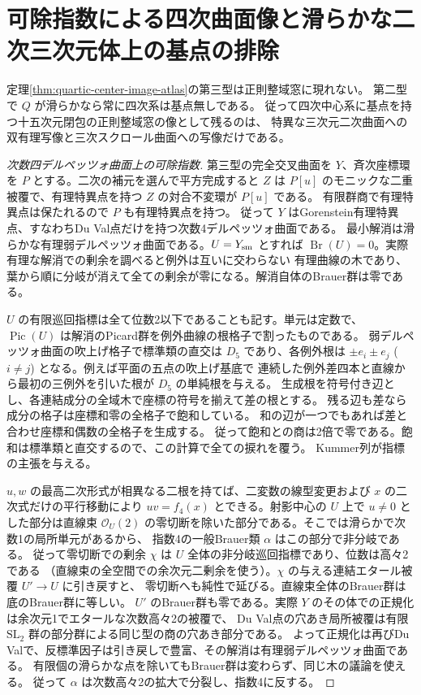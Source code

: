 \section{可除指数による四次曲面像と滑らかな二次三次元体上の基点の排除}
\label{sec:exclude-del-pezzo-center-images}
\begin{theorem}\label{thm:exclude-del-pezzo-center-images}
定理\ref{thm:quartic-center-image-atlas}の第三型は正則整域窓に現れない。
第二型で $Q$ が滑らかなら常に四次系は基点無しである。
従って四次中心系に基点を持つ十五次元閉包の正則整域窓の像として残るのは、
特異な三次元二次曲面への双有理写像と三次スクロール曲面への写像だけである。
\end{theorem}
\begin{proof}[次数四デルペッツォ曲面上の可除指数]
第三型の完全交叉曲面を $Y$、斉次座標環を $P$ とする。二次の補元を選んで平方完成すると
$Z$ は $P[u]$ のモニックな二重被覆で、有理特異点を持つ $Z$ の対合不変環が $P[u]$ である。
有限群商で有理特異点は保たれるので $P$ も有理特異点を持つ。
従って $Y$ はGorenstein有理特異点、すなわちDu Val点だけを持つ次数4デルペッツォ曲面である。
最小解消は滑らかな有理弱デルペッツォ曲面である。$U=Y_{\rm sm}$ とすれば
$\operatorname{Br}(U)=0$。実際有理な解消での剰余を調べると例外は互いに交わらない
有理曲線の木であり、葉から順に分岐が消えて全ての剰余が零になる。解消自体のBrauer群は零である。

$U$ の有限巡回指標は全て位数2以下であることも記す。単元は定数で、
$\operatorname{Pic}(U)$ は解消のPicard群を例外曲線の根格子で割ったものである。
弱デルペッツォ曲面の吹上げ格子で標準類の直交は $D_5$ であり、各例外根は
$\pm e_i\pm e_j$ ($i\ne j$) となる。例えば平面の五点の吹上げ基底で
連続した例外差四本と直線から最初の三例外を引いた根が $D_5$ の単純根を与える。
生成根を符号付き辺とし、各連結成分の全域木で座標の符号を揃えて差の根とする。
残る辺も差なら成分の格子は座標和零の全格子で飽和している。
和の辺が一つでもあれば差と合わせ座標和偶数の全格子を生成する。
従って飽和との商は2倍で零である。飽和は標準類と直交するので、この計算で全ての捩れを覆う。
Kummer列が指標の主張を与える。

$u,w$ の最高二次形式が相異なる二根を持てば、二変数の線型変更および $x$ の二次式だけの平行移動により
$uv=f_4(x)$ とできる。射影中心の $U$ 上で $u\ne0$ とした部分は直線束
$\mathcal O_U(2)$ の零切断を除いた部分である。そこでは滑らかで次数1の局所単元があるから、
指数4の一般Brauer類 $\alpha$ はこの部分で非分岐である。
従って零切断での剰余 $\chi$ は $U$ 全体の非分岐巡回指標であり、位数は高々2である
（直線束の全空間での余次元二剰余を使う）。$\chi$ の与える連結エタール被覆 $U'\to U$ に引き戻すと、
零切断へも純性で延びる。直線束全体のBrauer群は底のBrauer群に等しい。
$U'$ のBrauer群も零である。実際 $Y$ のその体での正規化は余次元1でエタールな次数高々2の被覆で、
Du Val点の穴あき局所被覆は有限 $\mathrm{SL}_2$ 群の部分群による同じ型の商の穴あき部分である。
よって正規化は再びDu Valで、反標準因子は引き戻しで豊富、その解消は有理弱デルペッツォ曲面である。
有限個の滑らかな点を除いてもBrauer群は変わらず、同じ木の議論を使える。
従って $\alpha$ は次数高々2の拡大で分裂し、指数4に反する。


\end{proof}
